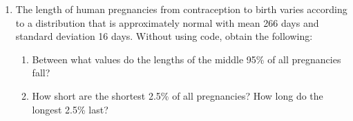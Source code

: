 \documentclass[
  letterpaper,
  DIV=11,
  numbers=noendperiod]{scrartcl}
\begin{document}
\begin{enumerate}
\def\labelenumi{\arabic{enumi}.}
\setcounter{enumi}{4}
\item
  The length of human pregnancies from contraception to birth varies
  according to a distribution that is approximately normal with mean 266
  days and standard deviation 16 days. Without using code, obtain the
  following:

  \begin{enumerate}
  \def\labelenumii{\alph{enumii}.}
  \item
    Between what values do the lengths of the middle 95\% of all
    pregnancies fall?
  \item
    How short are the shortest 2.5\% of all pregnancies? How long do the
    longest 2.5\% last?
  \end{enumerate}
\end{enumerate}
\end{document}
